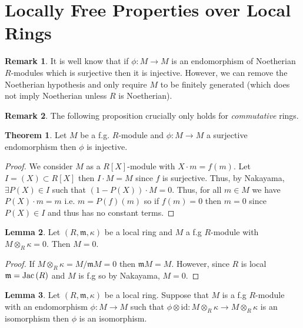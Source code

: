 \documentclass[12pt]{extarticle}
\newcommand{\id}{\mathrm{id}}
\theoremstyle{definition}
\newtheorem{theorem}{Theorem}[section]
\newtheorem{lemma}[theorem]{Lemma}
\newtheorem{remark}{Remark}
\newcommand{\m}{\mathfrak{m}}
\begin{document}
\section{Locally Free Properties over Local Rings}

\begin{remark}
It is well know that if $\phi : M \to M$ is an endomorphism of Noetherian $R$-modules which is surjective then it is injective. However, we can remove the Noetherian hypothesis and only require $M$ to be finitely generated (which does not imply Noetherian unless $R$ is Noetherian). 
\end{remark}

\begin{remark}
The following proposition crucially only holds for \textit{commutative} rings.  
\end{remark}

\begin{theorem}
Let $M$ be a f.g. $R$-module and $\phi : M \to M$ a surjective endomorphism then $\phi$ is injective.
\end{theorem}

\begin{proof}
We consider $M$ as a $R[X]$-module with $X \cdot m  = f(m)$. Let $I = (X) \subset R[X]$ then $I \cdot M = M$ since $f$ is surjective. Thus, by Nakayama, $\exists P(X) \in I$ such that $(1 - P(X)) \cdot M = 0$. Thus, for all $m \in M$ we have $P(X) \cdot m = m$ i.e. $m = P(f)(m)$ so if $f(m) = 0$ then $m = 0$ since $P(X) \in I$ and thus has no constant terms.
\end{proof}

\begin{lemma}
Let $(R, \m, \kappa)$ be a local ring and $M$ a f.g $R$-module with $M \otimes_R \kappa = 0$. Then $M = 0$.
\end{lemma}

\begin{proof}
If $M \otimes_R \kappa = M / \m M = 0$ then $\m M = M$. However, since $R$ is local $\m = \Jac{R}$ and $M$ is f.g so by Nakayama, $M = 0$.
\end{proof}

\begin{lemma}
Let $(R, \m, \kappa)$ be a local ring. Suppose that $M$ is a f.g $R$-module with an endomorphism $\phi : M \to M$ such that $\phi \otimes \id : M \otimes_R \kappa \to M \otimes_R \kappa$ is an isomorphism then $\phi$ is an isomorphism. 
\end{lemma}
\end{document}
